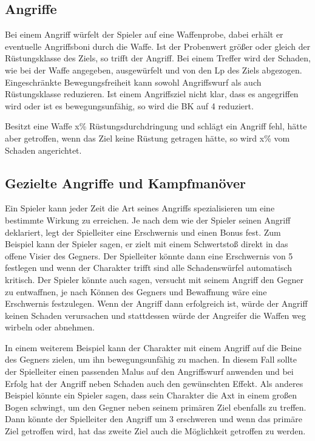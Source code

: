 \documentclass[../../Heldenanleitung2]{subfiles}
\begin{document}
\subsection{Angriffe}
Bei einem Angriff würfelt der Spieler auf eine Waffenprobe, dabei erhält er eventuelle Angriffsboni durch die Waffe. Ist der Probenwert größer oder gleich der Rüstungsklasse des Ziels, so trifft der Angriff. Bei einem Treffer wird der Schaden, wie bei der Waffe angegeben, ausgewürfelt und von den Lp des Ziels abgezogen. Eingeschränkte Bewegungsfreiheit kann sowohl Angriffswurf als auch Rüstungsklasse reduzieren. Ist einem Angriffsziel nicht klar, dass es angegriffen wird oder ist es bewegungsunfähig, so wird die BK auf 4 reduziert.

Besitzt eine Waffe x\% Rüstungsdurchdringung und schlägt ein Angriff fehl, hätte aber getroffen, wenn das Ziel keine Rüstung getragen hätte, so wird x\% vom Schaden angerichtet.

\subsection{Gezielte Angriffe und Kampfmanöver}
Ein Spieler kann jeder Zeit die Art seines Angriffs spezialisieren um eine bestimmte Wirkung zu erreichen. Je nach dem wie der Spieler seinen Angriff deklariert, legt der Spielleiter eine Erschwernis und einen Bonus fest. Zum Beispiel kann der Spieler sagen, er zielt mit einem Schwertstoß direkt in das offene Visier des Gegners. Der Spielleiter könnte dann eine Erschwernis von 5 festlegen und wenn der Charakter trifft sind alle Schadenswürfel automatisch kritisch. Der Spieler könnte auch sagen, versucht mit seinem Angriff den Gegner zu entwaffnen, je nach Können des Gegners und Bewaffnung wäre eine Erschwernis festzulegen. Wenn der Angriff dann erfolgreich ist, würde der Angriff keinen Schaden verursachen und stattdessen würde der Angreifer die Waffen weg wirbeln oder abnehmen.

In einem weiterem Beispiel kann der Charakter mit einem Angriff auf die Beine des Gegners zielen, um ihn bewegungsunfähig zu machen. In diesem Fall sollte der Spielleiter einen passenden Malus auf den Angriffswurf anwenden und bei Erfolg hat der Angriff neben Schaden auch den gewünschten Effekt. Als anderes Beispiel könnte ein Spieler sagen, dass sein Charakter die Axt in einem großen Bogen schwingt, um den Gegner neben seinem primären Ziel ebenfalls zu treffen. Dann könnte der Spielleiter den Angriff um 3 erschweren und wenn das primäre Ziel getroffen wird, hat das zweite Ziel auch die Möglichkeit getroffen zu werden.
\end{document}
